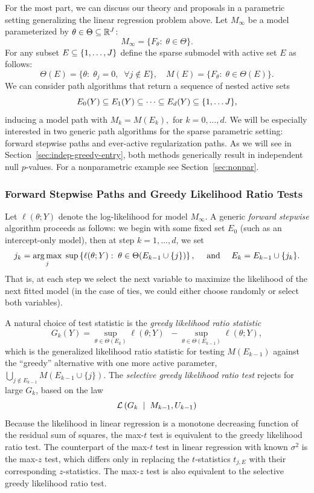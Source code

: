 \documentclass{article}
\begin{document}
For the most part, we can discuss our theory and proposals in a parametric setting generalizing the linear regression problem above. Let $M_\infty$ be a model parameterized by $\theta\in \Theta \subseteq \mathbb{R}^J$:
\[
M_\infty = \{F_\theta:\; \theta \in \Theta\}.
\]
For any subset $E\subseteq \{1,\ldots, J\}$ define the sparse submodel with active set $E$ as follows:
\[
\Theta(E) = \{\theta:\; \theta_j = 0, \;\;\forall j \notin E\}, 
\quad M(E) = \{F_\theta:\; \theta\in \Theta(E)\}.
\]
We can consider path algorithms that return a sequence of nested active sets
\[
E_0(Y) \subseteq E_1(Y) \subseteq \cdots \subseteq E_d(Y) \subseteq \{1,\ldots J\},
\]
inducing a model path with $M_k = M(E_k),$ for $k=0,\ldots,d$. We will be especially interested in two generic path algorithms for the sparse parametric setting: forward stepwise paths and ever-active regularization paths. As we will see in Section~\ref{sec:indep-greedy-entry}, both methods generically result in independent null $p$-values. For a nonparametric example see Section~\ref{sec:nonpar}.

\subsubsection{Forward Stepwise Paths and Greedy Likelihood Ratio Tests}
Let $\ell(\theta; Y)$ denote the log-likelihood for model
$M_\infty$. A generic {\em forward stepwise} algorithm proceeds as follows: we begin with some fixed set $E_0$ (such as an intercept-only model), then at step $k=1,\ldots,d$, we set
\begin{equation}
j_k = \operatorname*{arg\,max}_j \; \sup \left\{\ell(\theta; Y):\; \theta\in\Theta(E_{k-1} \cup \{j\})\right\}, \quad \text{ and } \quad
E_k = E_{k-1} \cup \{j_k\}.
\end{equation}
That is, at each step we select the next variable to maximize the likelihood of the next fitted model (in the case of ties, we could either choose randomly or select both variables).

A natural choice of test statistic is the {\em greedy likelihood ratio statistic}
\begin{equation}\label{eq:greedyLRT}
G_k(Y) = \sup_{\theta\in \Theta(E_k)} {\ell(\theta; Y)} \;\;- \sup_{\theta\in \Theta(E_{k-1})} {\ell(\theta; Y)},
\end{equation}
which is the generalized likelihood ratio statistic for testing $M(E_{k-1})$ against the ``greedy'' alternative with one more active parameter, $\bigcup_{j \notin E_{k-1}} M(E_{k-1} \cup \{j\})$. The {\em selective greedy likelihood ratio test} rejects for large $G_k$, based on the law
\begin{equation*}
\mathcal{L}\left(G_k \;\mid\; M_{k-1}, U_{k-1}\right)
\end{equation*}
Because the likelihood in linear regression is a monotone decreasing function of the residual sum of squares, the max-$t$ test is equivalent to the greedy likelihood ratio test. The counterpart of the max-$t$ test in linear regression with known $\sigma^2$ is the max-$z$ test, which differs only in replacing the $t$-statistics $t_{j,E}$ with their corresponding $z$-statistics. The max-$z$ test is also equivalent to the selective greedy likelihood ratio test.
\end{document}
